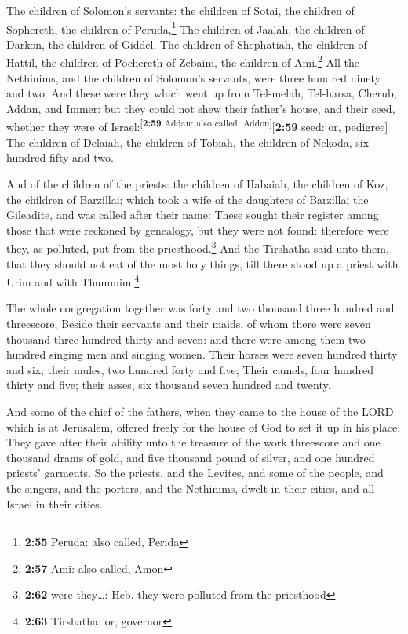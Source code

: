  The children of Solomon's servants: the children of
Sotai, the children of Sophereth, the children of Peruda,\footnote{\textbf{2:55}
  Peruda: also called, Perida}  The children of Jaalah,
the children of Darkon, the children of Giddel,  The
children of Shephatiah, the children of Hattil, the children of
Pochereth of Zebaim, the children of Ami.\footnote{\textbf{2:57} Ami:
  also called, Amon}  All the Nethinims, and the children
of Solomon's servants, were three hundred ninety and two.
 And these were they which went up from Tel-melah,
Tel-harsa, Cherub, Addan, and Immer: but they could not shew their
father's house, and their seed, whether they were of
Israel:\textsuperscript{{[}\textbf{2:59} Addan: also called,
Addon{]}}{[}\textbf{2:59} seed: or, pedigree{]}  The
children of Delaiah, the children of Tobiah, the children of Nekoda, six
hundred fifty and two.

 And of the children of the priests: the children of
Habaiah, the children of Koz, the children of Barzillai; which took a
wife of the daughters of Barzillai the Gileadite, and was called after
their name:  These sought their register among those that
were reckoned by genealogy, but they were not found: therefore were
they, as polluted, put from the priesthood.\footnote{\textbf{2:62} were
  they\ldots: Heb. they were polluted from the priesthood}
 And the Tirshatha said unto them, that they should not
eat of the most holy things, till there stood up a priest with Urim and
with Thummim.\footnote{\textbf{2:63} Tirshatha: or, governor}

 The whole congregation together was forty and two
thousand three hundred and threescore,  Beside their
servants and their maids, of whom there were seven thousand three
hundred thirty and seven: and there were among them two hundred singing
men and singing women.  Their horses were seven hundred
thirty and six; their mules, two hundred forty and five; 
Their camels, four hundred thirty and five; their asses, six thousand
seven hundred and twenty.

 And some of the chief of the fathers, when they came to
the house of the LORD which is at Jerusalem, offered freely for the
house of God to set it up in his place:  They gave after
their ability unto the treasure of the work threescore and one thousand
drams of gold, and five thousand pound of silver, and one hundred
priests' garments.  So the priests, and the Levites, and
some of the people, and the singers, and the porters, and the Nethinims,
dwelt in their cities, and all Israel in their cities.

